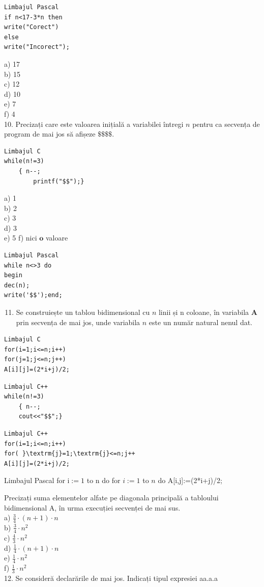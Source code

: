 \documentclass[10pt]{article}
\begin{document}
\begin{verbatim}
Limbajul Pascal
if n<17-3*n then
write("Corect")
else
write("Incorect");
\end{verbatim}

a) 17\\
b) 15\\
c) 12\\
d) 10\\
e) 7\\
f) 4\\
10. Precizați care este valoarea inițială a variabilei întregi $n$ pentru ca secvența de program de mai jos să afișeze $\mathbf{\$} \mathbf{\$} \mathbf{\$} \mathbf{\$}$.

\begin{verbatim}
Limbajul C
while(n!=3)
    { n--;
        printf("$$");}
\end{verbatim}

a) 1\\
b) 2\\
c) 3\\
d) 3\\
e) 5 f) nici $\mathbf{o}$ valoare

\begin{verbatim}
Limbajul Pascal
while n<>3 do
begin
dec(n);
write('$$');end;
\end{verbatim}

\begin{enumerate}
  \setcounter{enumi}{10}
  \item Se construiește un tablou bidimensional cu $n$ linii și n coloane, în variabila $\mathbf{A}$ prin secvența de mai jos, unde variabila $n$ este un număr natural nenul dat.
\end{enumerate}

\begin{verbatim}
Limbajul C
for(i=1;i<=n;i++)
for(j=1;j<=n;j++)
A[i][j]=(2*i+j)/2;
\end{verbatim}

\begin{verbatim}
Limbajul C++
while(n!=3)
    { n--;
    cout<<"$$";}
\end{verbatim}

\begin{verbatim}
Limbajul C++
for(i=1;i<=n;i++)
for( }\textrm{j}=1;\textrm{j}<=n;j++
A[i][j]=(2*i+j)/2;
\end{verbatim}

Limbajul Pascal for $\mathrm{i}:=1$ to n do for $i:=1$ to $n$ do A[i,j]:=(2*i+j)/2;

Precizați suma elementelor alfate pe diagonala principală a tabloului bidimensional A, în urma execuției secvenței de mai sus.\\
a) $\frac{3}{4} \cdot(n+1) \cdot n$\\
b) $\frac{3}{4} \cdot n^{2}$\\
c) $\frac{4}{3} \cdot n^{2}$\\
d) $\frac{1}{4} \cdot(n+1) \cdot n$\\
e) $\frac{1}{4} \cdot n^{2}$\\
f) $\frac{1}{3} \cdot n^{2}$\\
12. Se consideră declarările de mai jos. Indicați tipul expresiei aa.a.a
\end{document}
